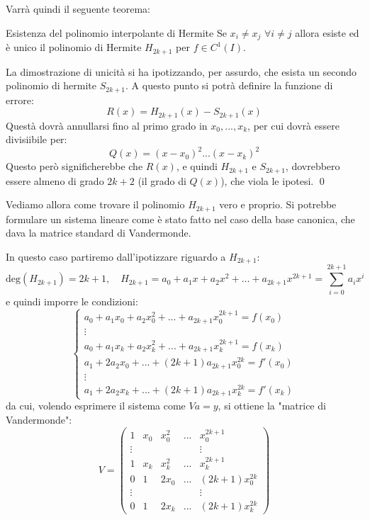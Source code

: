 \documentclass[a4paper,11pt]{article}
\begin{document}
Varrà quindi il seguente teorema:
\begin{theorem}{Esistenza del polinomio interpolante di Hermite}
	Se $x_i \neq x_j$ $\forall i \neq j$ allora esiste ed è unico il polinomio di Hermite $H_{2k + 1}$ per $f \in C^1(I)$. 
\end{theorem}
La dimostrazione di unicità si ha ipotizzando, per assurdo, che esista un secondo polinomio di hermite $S_{2k+1}$.
A questo punto si potrà definire la funzione di errore:
$$
R(x) = H_{2k + 1}(x) - S_{2k + 1}(x)
$$
Questà dovrà annullarsi fino al primo grado in $x_0, ..., x_k$, per cui dovrà essere divisiibile per:
$$
Q(x) = (x - x_0)^2 ... (x - x_k)^2
$$
Questo però significherebbe che $R(x)$, e quindi $H_{2k + 1}$ e $S_{2k + 1}$, dovrebbero essere almeno di grado $2k + 2$ (il grado di $Q(x)$), che viola le ipotesi. \qed 

\par\smallskip

Vediamo allora come trovare il polinomio $H_{2k + 1}$ vero e proprio.
Si potrebbe formulare un sistema lineare come è stato fatto nel caso della base canonica, che dava la matrice standard di Vandermonde.

In questo caso partiremo dall'ipotizzare riguardo a $H_{2k + 1}$:
$$
\mathrm{deg}(H_{2k + 1}) = 2k + 1, \quad H_{2k + 1} = a_0 + a_1 x + a_2 x^2 + ... + a_{2k + 1} x^{2k + 1} = \sum_{i = 0}^{2k + 1} a_i x^i
$$
e quindi imporre le condizioni:
\[
	\begin{cases}
		a_0 + a_1 x_0 + a_2 x_0^2 + ... + a_{2k + 1} x_0^{2k + 1} = f(x_0) \\	
		\vdots \\
		a_0 + a_1 x_k + a_2 x_k^2 + ... + a_{2k + 1} x_k^{2k + 1} = f(x_k) \\
		a_1 + 2 a_2 x_0 + ... + (2k + 1) a_{2k + 1} x_0^{2k} = f'(x_0) \\
		\vdots \\
		a_1 + 2 a_2 x_k + ... + (2k + 1) a_{2k + 1} x_k^{2k} = f'(x_k)
	\end{cases}
\]
da cui, volendo esprimere il sistema come $Va = y$, si ottiene la "matrice di Vandermonde":
$$
V = 
\begin{pmatrix}
	1 & x_0 & x_0^2 & ... & x_0^{2k + 1} \\	
	\vdots  & & & & \vdots \\
	1 & x_k & x_k^2 & ... & x_k^{2k + 1} \\
	0 & 1 & 2 x_0 & ... & (2k + 1) x_0^{2k} \\
	\vdots  & & & & \vdots \\
	0 & 1 & 2 x_k & ... & (2k + 1) x_k^{2k} 
\end{pmatrix}
$$
\end{document}
